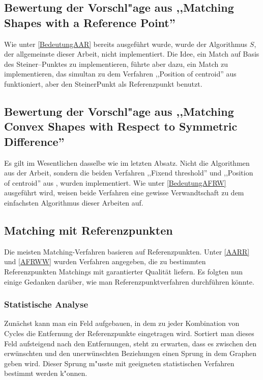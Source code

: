 \subsection[Bewertung der Vorschl"age aus \cite{AAR}]{Bewertung der Vorschl"age aus ,,Matching Shapes with a Reference Point'' \cite{AAR}}

Wie unter \vref{BedeutungAAR} bereits ausgeführt wurde, wurde der Algorithmus $S$, der allgemeinste dieser Arbeit, nicht implementiert. Die Idee, ein Match auf Basis des Steiner--Punktes zu implementieren, führte aber dazu, ein Match zu implementieren, das simultan zu dem Verfahren ,,Position of centroid'' aus \cite{TG} funktioniert, aber den SteinerPunkt als Referenzpunkt benutzt.

\subsection[Bewertung der Vorschl"age aus \cite{AFRW}]{Bewertung der Vorschl"age aus ,,Matching Convex Shapes with Respect to Symmetric Difference'' \cite{AFRW}}

Es gilt im Wesentlichen dasselbe wie  im letzten Absatz. Nicht die Algorithmen aus der Arbeit, sondern die beiden Verfahren ,,Fixend threshold'' und ,,Position of centroid'' aus \cite{TG}, wurden implementiert. Wie unter \vref{BedeutungAFRW} ausgeführt wird, weisen beide Verfahren  eine gewisse Verwandtschaft zu dem einfachsten Algorithmus dieser Arbeiten auf. 


\subsection{Matching mit Referenzpunkten}

Die meisten Matching-Verfahren basieren auf Referenzpunkten. Unter \vref{AARR} und \vref{AFRWW} wurden Verfahren angegeben, die zu bestimmten Referenzpunkten Matchings mit garantierter Qualität liefern. Es folgten nun einige Gedanken darüber, wie man Referenzpunktverfahren durchführen könnte.


\subsubsection*{Statistische Analyse}

Zunächst kann man ein Feld aufgebauen, in dem zu jeder Kombination von Cycles die Entfernung der Referenzpunkte eingetragen wird. Sortiert man dieses Feld aufsteigend nach den Entfernungen, steht zu erwarten, dass es zwischen den erwünschten und den unerwünschten Beziehungen einen Sprung in dem Graphen geben wird.  Dieser Sprung m"usste mit geeigneten statistischen Verfahren bestimmt werden k"onnen. 

